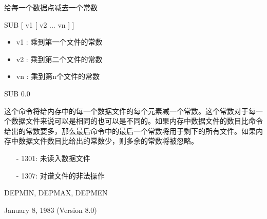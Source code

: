 \label{cmd:sub}

给每一个数据点减去一个常数

SUB  [ v1 [ v2 ... vn ] ]

\begin{itemize}
\item v1 :  乘到第一个文件的常数 
\item v2 :  乘到第二个文件的常数 
\item vn :  乘到第n个文件的常数 
\end{itemize}

SUB 0.0

这个命令将给内存中的每一个数据文件的每个元素减一个常数。这个常数对于每一个数据文件来说可以是相同的也可以是不同的。如果内存中数据文件的数目比命令给出的常数要多，那么最后命令中的最后一个常数将用于剩下的所有文件。如果内存中数据文件数目比给出的常数少，则多余的常数将被忽略。

\begin{itemize}
\item[-]1301: 未读入数据文件
\item[-]1307: 对谱文件的非法操作
\end{itemize}

DEPMIN, DEPMAX, DEPMEN

January 8, 1983 (Version 8.0)
